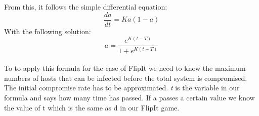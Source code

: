 From this, it follows the simple differential equation:
\begin{equation}
\dfrac{d a}{dt} = Ka(1-a)
\end{equation}
With the following solution:
\begin{equation}
a = \dfrac{e^{K(t-T)}}{1+e^{K(t-T)}}
\end{equation}
\\

To to apply this formula for the case of FlipIt we need to know the maximum numbers of hosts that can be infected before the total system is compromised. The initial compromise rate has to be approximated. \textit{t} is the variable in our formula and says how many time has passed. If a passes a certain value we know the value of t which is the same as d in our FlipIt game.

